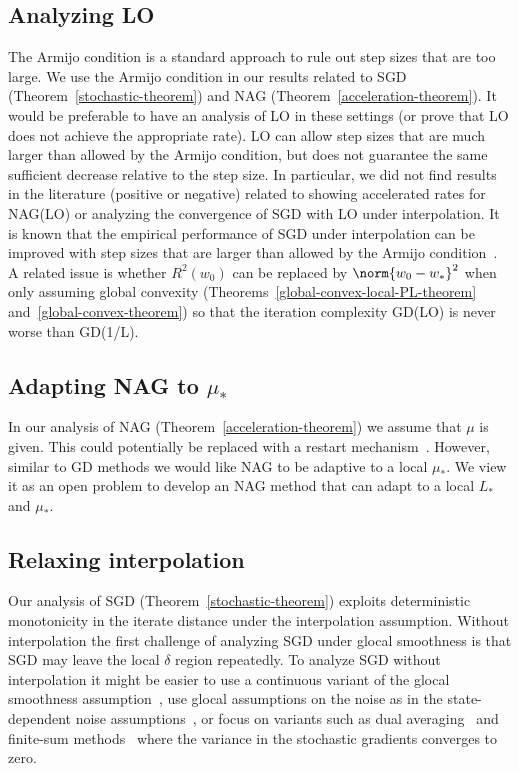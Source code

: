 \documentclass[10pt]{article} %
\begin{document}
\subsection{Analyzing LO} The Armijo condition is a standard approach to rule out step sizes that are too large. We use the Armijo condition in our results related to 
SGD (Theorem~\ref{stochastic-theorem}) and NAG (Theorem~\ref{acceleration-theorem}). 
It would be preferable to have an analysis of LO in these settings (or prove that LO does not achieve the appropriate rate). LO can allow step sizes that are much larger than allowed by the Armijo condition, but does not guarantee the same sufficient decrease relative to the step size. In particular, we did not find results in the literature (positive or negative) related to 
showing accelerated rates for NAG(LO) or analyzing the convergence of SGD with LO under interpolation. It is known that the empirical performance of SGD under interpolation can be improved with step sizes that are larger than allowed by the Armijo condition~\cite{galli2024don}.
A related issue is whether $R^2(w_0)$ can be replaced by $\norm{w_0 -w _*}^2$ when only assuming global convexity (Theorems~\ref{global-convex-local-PL-theorem} and~\ref{global-convex-theorem}) so that the iteration complexity GD(LO) is never worse than GD(1/L).

\subsection{Adapting NAG to $\mu_*$} In our analysis of NAG (Theorem~\ref{acceleration-theorem}) we assume that $\mu$ is given. This could potentially be replaced with a restart mechanism~\cite{nesterov2013gradient}. However, similar to GD methods we would like NAG to be adaptive to a local $\mu_*$. We view it as an open problem to develop an NAG method that can adapt to a local $L_*$ and $\mu_*$.

\subsection{Relaxing interpolation} Our analysis of SGD (Theorem~\ref{stochastic-theorem}) exploits deterministic monotonicity in the iterate distance under the interpolation assumption. Without interpolation the first challenge of analyzing SGD under glocal smoothness is that SGD may leave the local $\delta$ region repeatedly. To analyze SGD without interpolation it might be easier to use a continuous variant of the glocal smoothness assumption~\cite{vaswani2025armijo}, use glocal assumptions on the noise as in the state-dependent noise assumptions~\cite{ilandarideva2024accelerated}, or focus on variants such as dual averaging~\cite{nesterov2009primal} and finite-sum methods~\cite{SchmidtRB17} where the variance in the stochastic gradients converges to zero. 
\end{document}
